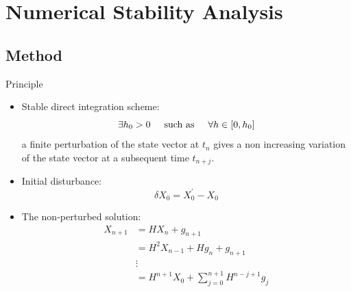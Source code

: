 \section{Numerical Stability Analysis}
\subsection{Method}
\begin{frame}{Principle}
\begin{itemize}
\item Stable direct integration scheme:
\begin{equation*}
\exists h_0 > 0 \hspace{0.5cm}\text{such as} \hspace{0.5cm} \forall h \in [0,h_0]
\end{equation*}  
a finite perturbation of the state vector at $t_n$ gives a non increasing variation of the state vector at a subsequent time $t_{n+j}$.
\item Initial disturbance:
\begin{equation}
\delta X_0 = X_0^\prime - X_0
\end{equation}
\item The non-perturbed solution:
\begin{align}
X_{n+1} &= H X_n + g_{n+1} \\
&= H^2 X_{n-1} + Hg_n + g_{n+1} \\
&\vdots\\
&= H^{n+1}X_0 + \sum^{n+1}_{j=0} H^{n-j+1}g_j
\end{align}
\end{itemize}
\end{frame}

